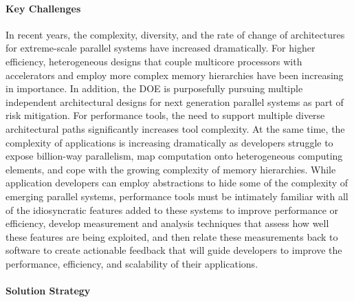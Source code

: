 \paragraph{Key  Challenges}

In recent years, the complexity, diversity, and the rate of change of architectures for extreme-scale parallel systems have increased dramatically. For higher efficiency, heterogeneous designs that couple multicore processors with accelerators and employ more complex memory hierarchies have been increasing in importance. In addition,  the DOE is purposefully pursuing multiple independent architectural designs for next generation parallel systems as part of risk mitigation. For performance tools, the need to support multiple diverse architectural paths significantly increases tool complexity. 
At the same time, the complexity of applications is increasing dramatically as developers struggle to expose billion-way parallelism, map computation onto heterogeneous computing elements, and cope with the growing complexity of memory hierarchies. While application developers can employ abstractions to hide some of the complexity of emerging parallel systems, performance tools must be intimately familiar with all of the idiosyncratic features added to these systems to improve performance or efficiency, develop measurement and analysis techniques that assess how well these features are being exploited, and then relate these measurements back to software to create actionable feedback that will guide developers to improve the performance, efficiency, and scalability of their applications.

\paragraph{Solution Strategy}

